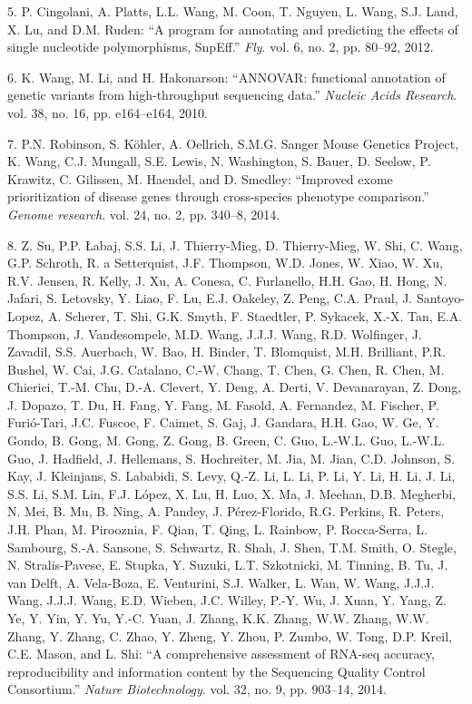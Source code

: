 \documentclass[12pt,twoside]{ugathesis}
\begin{document}
\hypertarget{ref-Cingolani2012}{}
5. P. Cingolani, A. Platts, L.L. Wang, M. Coon, T. Nguyen, L. Wang, S.J.
Land, X. Lu, and D.M. Ruden: ``A program for annotating and predicting
the effects of single nucleotide polymorphisms, SnpEff.'' \emph{Fly}.
vol. 6, no. 2, pp. 80--92, 2012.

\hypertarget{ref-Wang2010}{}
6. K. Wang, M. Li, and H. Hakonarson: ``ANNOVAR: functional annotation
of genetic variants from high-throughput sequencing data.''
\emph{Nucleic Acids Research}. vol. 38, no. 16, pp. e164--e164, 2010.

\hypertarget{ref-Robinson2014}{}
7. P.N. Robinson, S. Köhler, A. Oellrich, S.M.G. Sanger Mouse Genetics
Project, K. Wang, C.J. Mungall, S.E. Lewis, N. Washington, S. Bauer, D.
Seelow, P. Krawitz, C. Gilissen, M. Haendel, and D. Smedley: ``Improved
exome prioritization of disease genes through cross-species phenotype
comparison.'' \emph{Genome research}. vol. 24, no. 2, pp. 340--8, 2014.

\hypertarget{ref-Su2014}{}
8. Z. Su, P.P. Łabaj, S.S. Li, J. Thierry-Mieg, D. Thierry-Mieg, W. Shi,
C. Wang, G.P. Schroth, R. a Setterquist, J.F. Thompson, W.D. Jones, W.
Xiao, W. Xu, R.V. Jensen, R. Kelly, J. Xu, A. Conesa, C. Furlanello,
H.H. Gao, H. Hong, N. Jafari, S. Letovsky, Y. Liao, F. Lu, E.J. Oakeley,
Z. Peng, C.A. Praul, J. Santoyo-Lopez, A. Scherer, T. Shi, G.K. Smyth,
F. Staedtler, P. Sykacek, X.-X. Tan, E.A. Thompson, J. Vandesompele,
M.D. Wang, J.J.J. Wang, R.D. Wolfinger, J. Zavadil, S.S. Auerbach, W.
Bao, H. Binder, T. Blomquist, M.H. Brilliant, P.R. Bushel, W. Cai, J.G.
Catalano, C.-W. Chang, T. Chen, G. Chen, R. Chen, M. Chierici, T.-M.
Chu, D.-A. Clevert, Y. Deng, A. Derti, V. Devanarayan, Z. Dong, J.
Dopazo, T. Du, H. Fang, Y. Fang, M. Fasold, A. Fernandez, M. Fischer, P.
Furió-Tari, J.C. Fuscoe, F. Caimet, S. Gaj, J. Gandara, H.H. Gao, W. Ge,
Y. Gondo, B. Gong, M. Gong, Z. Gong, B. Green, C. Guo, L.-W.L. Guo,
L.-W.L. Guo, J. Hadfield, J. Hellemans, S. Hochreiter, M. Jia, M. Jian,
C.D. Johnson, S. Kay, J. Kleinjans, S. Lababidi, S. Levy, Q.-Z. Li, L.
Li, P. Li, Y. Li, H. Li, J. Li, S.S. Li, S.M. Lin, F.J. López, X. Lu, H.
Luo, X. Ma, J. Meehan, D.B. Megherbi, N. Mei, B. Mu, B. Ning, A. Pandey,
J. Pérez-Florido, R.G. Perkins, R. Peters, J.H. Phan, M. Pirooznia, F.
Qian, T. Qing, L. Rainbow, P. Rocca-Serra, L. Sambourg, S.-A. Sansone,
S. Schwartz, R. Shah, J. Shen, T.M. Smith, O. Stegle, N. Stralis-Pavese,
E. Stupka, Y. Suzuki, L.T. Szkotnicki, M. Tinning, B. Tu, J. van Delft,
A. Vela-Boza, E. Venturini, S.J. Walker, L. Wan, W. Wang, J.J.J. Wang,
J.J.J. Wang, E.D. Wieben, J.C. Willey, P.-Y. Wu, J. Xuan, Y. Yang, Z.
Ye, Y. Yin, Y. Yu, Y.-C. Yuan, J. Zhang, K.K. Zhang, W.W. Zhang, W.W.
Zhang, Y. Zhang, C. Zhao, Y. Zheng, Y. Zhou, P. Zumbo, W. Tong, D.P.
Kreil, C.E. Mason, and L. Shi: ``A comprehensive assessment of RNA-seq
accuracy, reproducibility and information content by the Sequencing
Quality Control Consortium.'' \emph{Nature Biotechnology}. vol. 32, no.
9, pp. 903--14, 2014.
\end{document}
